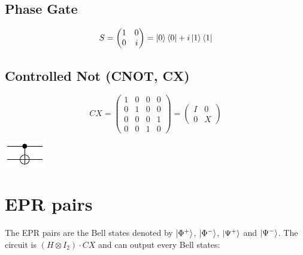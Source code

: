 \documentclass[a4paper,10pt]{scrartcl}
\begin{document}
\subsection*{Phase Gate}
\[S = 
\begin{pmatrix}
1 & 0\\ 
0 & i
\end{pmatrix}
= \ket{0}\bra{0} + i\ket{\text{1}}\bra{1}
\]



\subsection*{Controlled Not (CNOT, CX)}


\begin{minipage}{\linewidth}
\begin{minipage}{0.5\linewidth}\center
\[CX = 
\begin{pmatrix}
1 & 0 & 0 & 0\\ 
0 & 1 & 0 & 0 \\
0 & 0 & 0 & 1 \\
0 & 0 & 1 & 0
\end{pmatrix}
= 
\begin{pmatrix}
I & 0\\ 
0 & X

\end{pmatrix}
\]
\end{minipage}
\begin{minipage}{0.5\linewidth}\center
\vspace*{\fill}
\includegraphics[scale=2]{img/CNOT_gate.pdf}
\vspace*{\fill}
\end{minipage}
\end{minipage}

\newpage
\section*{EPR pairs}
The EPR pairs are the Bell states denoted by $\ket{\Phi ^+}$, $\ket{\Phi ^-}$, $\ket{\Psi ^+}$ and $\ket{\Psi ^-}$.
The circuit is $(H\otimes I_2) \cdot CX$ and can output every Bell states:

\vspace{2\baselineskip}
\end{document}
